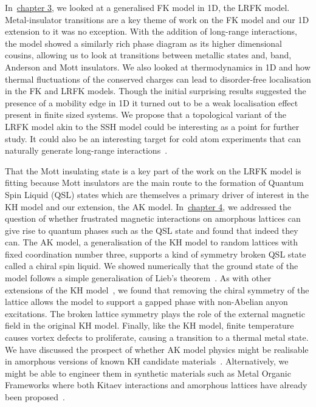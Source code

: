 In~\protect\hyperlink{chap:3-the-long-range-falicov-kimball-model}{chapter 3}, we looked at a generalised FK model in 1D, the LRFK model. Metal-insulator transitions are a key theme of work on the FK model and our 1D extension to it was no exception. With the addition of long-range interactions, the model showed a similarly rich phase diagram as its higher dimensional cousins, allowing us to look at transitions between metallic states and, band, Anderson and Mott insulators. We also looked at thermodynamics in 1D and how thermal fluctuations of the conserved charges can lead to disorder-free localisation in the FK and LRFK models. Though the initial surprising results suggested the presence of a mobility edge in 1D it turned out to be a weak localisation effect present in finite sized systems. We propose that a topological variant of the LRFK model akin to the SSH model could be interesting as a point for further study. It could also be an interesting target for cold atom experiments that can naturally generate long-range interactions~\autocite{lepersLongrangeInteractionsUltracold2017}.

That the Mott insulating state is a key part of the work on the LRFK model is fitting because Mott insulators are the main route to the formation of Quantum Spin Liquid (QSL) states which are themselves a primary driver of interest in the KH model and our extension, the AK model. In~\protect\hyperlink{chap:4-the-amorphous-kitaev-model}{chapter 4}, we addressed the question of whether frustrated magnetic interactions on amorphous lattices can give rise to quantum phases such as the QSL state and found that indeed they can. The AK model, a generalisation of the KH model to random lattices with fixed coordination number three, supports a kind of symmetry broken QSL state called a chiral spin liquid. We showed numerically that the ground state of the model follows a simple generalisation of Lieb's theorem~\autocite{lieb_flux_1994,OBrienPRB2016,eschmannThermodynamicClassificationThreedimensional2020}. As with other extensions of the KH model~\autocite{yaoExactChiralSpin2007}, we found that removing the chiral symmetry of the lattice allows the model to support a gapped phase with non-Abelian anyon excitations. The broken lattice symmetry plays the role of the external magnetic field in the original KH model. Finally, like the KH model, finite temperature causes vortex defects to proliferate, causing a transition to a thermal metal state. We have discussed the prospect of whether AK model physics might be realisable in amorphous versions of known KH candidate materials~\autocite{TrebstPhysRep2022}. Alternatively, we might be able to engineer them in synthetic materials such as Metal Organic Frameworks where both Kitaev interactions and amorphous lattices have already been proposed~\autocite{yamadaDesigningKitaevSpin2017,bennett2014amorphous}.

